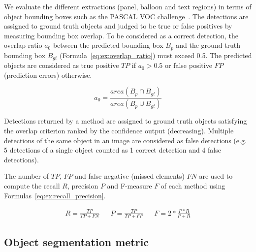 We evaluate the different extractions (panel, balloon and text regions) in terms of object bounding boxes such as the PASCAL VOC challenge~\cite{everingham2010pascal}.
The detections are assigned to ground truth objects and judged to be true or false positives by measuring bounding box overlap.
To be considered as a correct detection, the overlap ratio $a_0$ between the predicted bounding box $B_p$ and the ground truth bounding box $B_{gt}$ (Formula~\ref{eq:ex:overlap_ratio}) must exceed 0.5.
The predicted objects are considered as true positive $TP$ if $a_0 > 0.5$ or false positive $FP$ (prediction errors) otherwise.

\begin{equation}
\label{eq:ex:overlap_ratio}
  a_0 = \frac{area(B_p \cap B_{gt})}{area(B_p \cup B_{gt})}
\end{equation}

Detections returned by a method are assigned to ground truth objects satisfying the overlap criterion ranked by the confidence output (decreasing).
Multiple detections of the same object in an image are considered as false detections (e.g. 5 detections of a single object counted as 1 correct detection and 4 false detections).

The number of $TP$, $FP$ and false negative (missed elements) $FN$ are used to compute the recall $R$, precision $P$ and F-measure $F$ of each method using Formulas~\ref{eq:ex:recall_precision}.

\begin{align}
\label{eq:ex:recall_precision}
R = \frac{TP}{TP + FN} && P = \frac{TP}{TP + FP} && F = 2 * \frac{P * R}{P + R}
\end{align}




\subsection{Object segmentation metric} %
\label{sub:ex:object_segmentation_metric}

